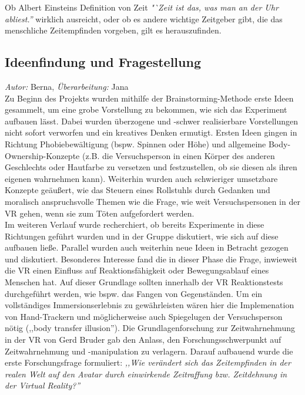 \documentclass{Bericht}
\begin{document}
	Ob  Albert Einsteins Definition von Zeit \textit{"`Zeit ist das, was man an der Uhr abliest.'' } wirklich ausreicht, oder ob es andere wichtige Zeitgeber gibt, die das menschliche Zeitempfinden vorgeben, gilt es herauszufinden. 

\label{subsec:ideenfindung}
\subsection{Ideenfindung und Fragestellung}
\textit{Autor:} Berna, \textit{Überarbeitung:} Jana\\
Zu Beginn des Projekts wurden mithilfe der Brainstorming-Methode erste Ideen gesammelt, um eine grobe Vorstellung zu bekommen, wie sich das Experiment aufbauen lässt. Dabei wurden überzogene und -schwer realisierbare Vorstellungen nicht sofort verworfen und ein kreatives Denken ermutigt.
Ersten Ideen gingen in Richtung Phobiebewältigung (bspw. Spinnen oder Höhe) und allgemeine Body-Ownership-Konzepte (z.B. die Versuchsperson in einen Körper des anderen Geschlechts oder Hautfarbe zu versetzen und festzustellen, ob sie diesen als ihren eigenen wahrnehmen kann). Weiterhin wurden auch schwieriger umsetzbare Konzepte geäußert, wie das Steuern eines Rollstuhls durch Gedanken und moralisch anspruchsvolle Themen wie die Frage, wie weit Versuchspersonen in der VR gehen, wenn sie zum Töten aufgefordert werden.\\
Im weiteren Verlauf wurde recherchiert, ob bereits Experimente in diese Richtungen geführt wurden und in der Gruppe diskutiert, wie sich auf diese aufbauen ließe. Parallel wurden auch weiterhin neue Ideen in Betracht gezogen und diskutiert. Besonderes Interesse fand die in dieser Phase die Frage, inwieweit die VR einen Einfluss auf Reaktionsfähigkeit oder Bewegungsablauf eines Menschen hat. Auf dieser Grundlage sollten innerhalb der VR Reaktionstests durchgeführt werden, wie bspw. das Fangen von Gegenständen. Um ein vollständiges Immersionserlebnis zu gewährleisten wären hier die Implemenation von Hand-Trackern und möglicherweise auch Spiegelugen der Versuchsperson nötig (,,body transfer illusion''). Die Grundlagenforschung zur Zeitwahrnehmung in der VR von Gerd Bruder gab den Anlass, den Forschungsschwerpunkt auf Zeitwahrnehmung und -manipulation zu verlagern. Darauf aufbauend wurde die erste Forschungsfrage formuliert:
\textit{,,Wie verändert sich das Zeitempfinden in der realen Welt auf den Avatar durch einwirkende Zeitraffung bzw. Zeitdehnung in der Virtual Reality?''}\\
\end{document}
